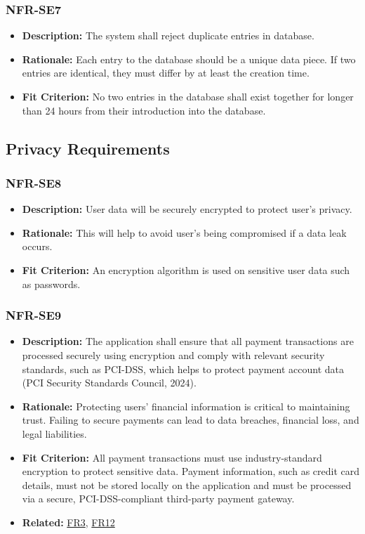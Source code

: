 \documentclass[12pt]{article}
\begin{document}
\subsubsection*{NFR-SE7}
\label{sec:SE7}
\begin{itemize}
  \item \textbf{Description:} The system shall reject duplicate entries in database.
  \item \textbf{Rationale:} Each entry to the database should be a unique data piece. If two entries are identical, they must differ by at least the creation time.
  \item \textbf{Fit Criterion:} No two entries in the database shall exist together for longer than 24 hours from their introduction into the database.
\end{itemize}
\subsection{Privacy Requirements}
\subsubsection*{NFR-SE8}
\label{sec:SE8}
\begin{itemize}
  \item \textbf{Description:} User data will be securely encrypted to protect user’s privacy.
  \item \textbf{Rationale:} This will help to avoid user's being compromised if a data leak occurs.
  \item \textbf{Fit Criterion:} An encryption algorithm is used on sensitive user data such as passwords.
\end{itemize}
\subsubsection*{NFR-SE9}
\label{sec:SE9}
\begin{itemize}
  \item \textbf{Description:} The application shall ensure that all payment transactions are processed securely using encryption and comply with relevant security standards, such as PCI-DSS, which helps to protect payment account data (PCI Security Standards Council, 2024).
  \item \textbf{Rationale:} Protecting users' financial information is critical to maintaining trust. Failing to secure payments can lead to data breaches, financial loss, and legal liabilities.
  \item \textbf{Fit Criterion:} All payment transactions must use industry-standard encryption to protect sensitive data. Payment information, such as credit card details, must not be stored locally on the application and must be processed via a secure, PCI-DSS-compliant third-party payment gateway.
  \item \textbf{Related:} \hyperref[sec:FR3]{FR3}, \hyperref[sec:FR12]{FR12}
\end{itemize}
\end{document}
